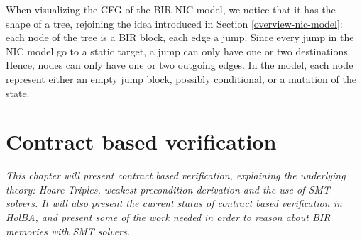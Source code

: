 \documentclass{kththesis}
\begin{document}
When visualizing the \gls{CFG} of the BIR NIC model, we notice that it has the shape of a tree, rejoining the idea introduced in Section \ref{overview-nic-model}: each node of the tree is a BIR block, each edge a jump. Since every jump in the NIC model go to a static target, a jump can only have one or two destinations. Hence, nodes can only have one or two outgoing edges. In the model, each node represent either an empty jump block, possibly conditional, or a mutation of the state.


%

\chapter{Contract based verification} \label{contract-based-verif}
\vspace{-1cm}
\textit{This chapter will present contract based verification, explaining the underlying theory: Hoare Triples, weakest precondition derivation and the use of SMT solvers. It will also present the current status of contract based verification in HolBA, and present some of the work needed in order to reason about BIR memories with SMT solvers.}
\end{document}
